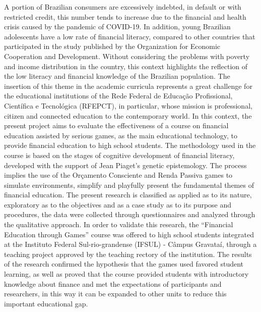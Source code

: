 A portion of Brazilian consumers are excessively indebted, in default or with restricted credit, this number tends to increase due to the financial and health crisis caused by the pandemic of COVID-19. In addition, young Brazilian adolescents have a low rate of financial literacy, compared to other countries that participated in the study published by the Organization for Economic Cooperation and Development. Without considering the problems with poverty and income distribution in the country, this context highlights the reflection of the low literacy and financial knowledge of the Brazilian population. The insertion of this theme in the academic curricula represents a great challenge for the educational institutions of the Rede Federal de Educação Profissional, Científica e Tecnológica (RFEPCT), in particular, whose mission is professional, citizen and connected education to the contemporary world. In this context, the present project aims to evaluate the effectiveness of a course on financial education assisted by serious games, as the main educational technology, to provide financial education to high school students. The methodology used in the course is based on the stages of cognitive development of financial literacy, developed with the support of Jean Piaget's genetic epistemology. The process implies the use of the Orçamento Consciente and Renda Passiva games to simulate environments, simplify and playfully present the fundamental themes of financial education. The present research is classified as applied as to its nature, exploratory as to the objectives and as a case study as to its purpose and procedures, the data were collected through questionnaires and analyzed through the qualitative approach. In order to validate this research, the “Financial Education through Games” course was offered to high school students integrated at the Instituto Federal Sul-rio-grandense (IFSUL) - Câmpus Gravataí, through a teaching project approved by the teaching rectory of the institution. The results of the research confirmed the hypothesis that the games used favored student learning, as well as proved that the course provided students with introductory knowledge about finance and met the expectations of participants and researchers, in this way it can be expanded to other units to reduce this important educational gap.